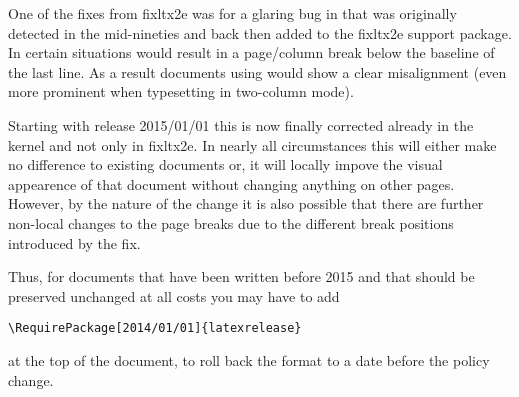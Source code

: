 \documentclass{ltnews}
\begin{document}
One of the fixes from \textsf{fixltx2e} was for a glaring bug in
 that was originally detected in the mid-nineties and
back then added to the \textsf{fixltx2e} support package. In certain
situations  would result in a page/column break below
the baseline of the last line. As a result documents using
 would show a clear misalignment (even more prominent
when typesetting in two-column mode).

Starting with release 2015/01/01 this is now finally corrected already
in the kernel and not only in \textsf{fixltx2e}.  In nearly all
circumstances this will either make no difference to existing
documents or, it will locally impove the visual appearence of that
document without changing anything on other pages.  However, by the
nature of the change it is also possible that there are further
non-local changes to the page breaks due to the different break
positions introduced by the fix.

Thus, for documents that have been written before 2015 and that should
be preserved unchanged at all costs you may have to add
\begin{verbatim}
\RequirePackage[2014/01/01]{latexrelease}
\end{verbatim}
at the top of the document, to roll back the format to a date before
the policy change.
\end{document}
